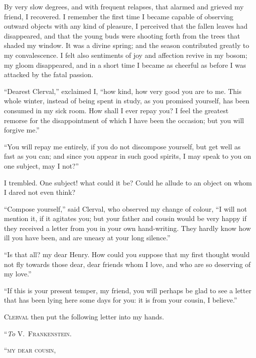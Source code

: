 By very slow degrees, and with frequent
relapses, that alarmed and grieved
my friend, I recovered. I remember
the first time I became capable of observing
outward objects with any kind
of pleasure, I perceived that the fallen
leaves had disappeared, and that the
young buds were shooting forth from
the trees that shaded my window. It
was a divine spring; and the season
contributed greatly to my convalescence.
I felt also sentiments of joy
and affection revive in my bosom; my
gloom disappeared, and in a short time
I became as cheerful as before I was
attacked by the fatal passion.

``Dearest Clerval,'' exclaimed I,
``how kind, how very good you are to
me. This whole winter, instead of
being spent in study, as you promised
yourself, has been consumed in my
sick room. How shall I ever repay
you? I feel the greatest remorse for
the disappointment of which I have
been the occasion; but you will forgive
me.''

``You will repay me entirely, if you
do not discompose yourself, but get
well as fast as you can; and since you
appear in such good spirits, I may
speak to you on one subject, may I
not?''

I trembled. One subject! what could
it be? Could he allude to an object on
whom I dared not even think?

``Compose yourself,'' said Clerval,
who observed my ch\-ange of colour, ``I
will not mention it, if it agitates you;
but your father and cousin would be
very happy if they received a letter from
you in your own hand-writing. They
hardly know how ill you have been,
and are uneasy at your long silence.''

``Is that all? my dear Henry. How
could you suppose that my first thought
would not fly towards those dear, dear
friends whom I love, and who are so
deserving of my love.''

``If this is your present temper, my
friend, you will perhaps be glad to see
a letter that has been lying here some
days for you: it is from your cousin, I
believe.''


\textsc{Clerval} then put the following letter
into my hands.

\bigskip
\noindent ``\emph{To} V.~\textsc{Frankenstein}.
\medskip

\noindent ``\textsc{my dear cousin},
\medskip


